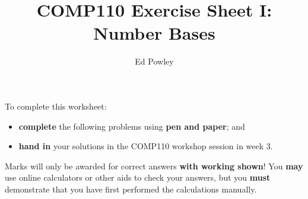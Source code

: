 \documentclass{../../../fal_assignment}
\title{COMP110 Exercise Sheet I: Number Bases}
\author{Ed Powley}
\begin{document}
\maketitle

To complete this worksheet:
\begin{itemize}
    \item \textbf{complete} the following problems using \textbf{pen and paper}; and
    \item \textbf{hand in} your solutions in the COMP110 workshop session in week 3.
\end{itemize}

Marks will only be awarded for correct answers \textbf{with working shown}!
You \textbf{may} use online calculators or other aids to check your answers,
but you \textbf{must} demonstrate that you have first performed the calculations manually.
\end{document}
